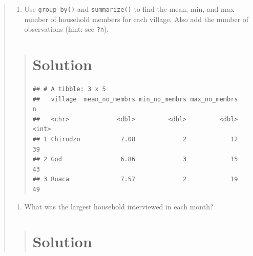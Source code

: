 \documentclass[]{book}
\newenvironment{Shaded}{\begin{snugshade}}{\end{snugshade}}
\newcommand{\KeywordTok}[1]{\textcolor[rgb]{0.13,0.29,0.53}{\textbf{#1}}}
\newcommand{\DataTypeTok}[1]{\textcolor[rgb]{0.13,0.29,0.53}{#1}}
\newcommand{\StringTok}[1]{\textcolor[rgb]{0.31,0.60,0.02}{#1}}
\newcommand{\OperatorTok}[1]{\textcolor[rgb]{0.81,0.36,0.00}{\textbf{#1}}}
\newcommand{\NormalTok}[1]{#1}
\providecommand{\tightlist}{%
  \setlength{\itemsep}{0pt}\setlength{\parskip}{0pt}}
\begin{document}
\begin{quote}
\begin{enumerate}
\def\labelenumi{\arabic{enumi}.}
\setcounter{enumi}{1}
\tightlist
\item
  Use \texttt{group\_by()} and \texttt{summarize()} to find the mean,
  min, and max number of household members for each village. Also add
  the number of observations (hint: see \texttt{?n}).
\end{enumerate}

\begin{quote}
\section{Solution}\label{solution-9}

\begin{Shaded}
\end{Shaded}

\begin{verbatim}
## # A tibble: 3 x 5
##   village  mean_no_membrs min_no_membrs max_no_membrs     n
##   <chr>             <dbl>         <dbl>         <dbl> <int>
## 1 Chirodzo           7.08             2            12    39
## 2 God                6.86             3            15    43
## 3 Ruaca              7.57             2            19    49
\end{verbatim}
\end{quote}

\begin{enumerate}
\def\labelenumi{\arabic{enumi}.}
\setcounter{enumi}{2}
\tightlist
\item
  What was the largest household interviewed in each month?
\end{enumerate}

\begin{quote}
\section{Solution}\label{solution-10}


\end{quote}
\end{quote}
\end{document}
